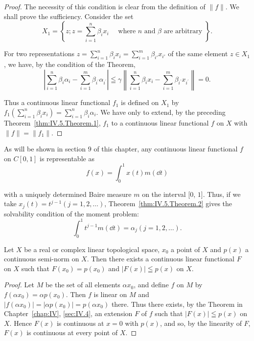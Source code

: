 \begin{proof}
 The necessity of this condition is clear from the definition of $\|f\|$. We shall prove the sufficiency. Consider the set 
\[
X _{1} = \left\{z; z = \sum\limits_{i=1} ^{n} \beta_{i} x _{i} \quad \text{ where } n \text{ and } \beta \text{ are arbitrary } \right\}. \]

For two representations $z = \sum\limits_{i=1}^{n} \beta_i x_i = \sum\limits_{i=1}^{m} \beta_{i'} x_{i'}$ of the same element $z \in X_1$, we have, by the condition of the Theorem, 
\[
\left| \sum\limits_{i=1} ^{n} \beta_{i} \alpha_{i} - \sum\limits_{i=1} ^{m} \beta_ {i ^{\prime}} \alpha_ {i ^{\prime}} \right| \leqq \gamma \left\| \sum\limits_{i=1} ^{n} \beta_{i} x _{i} - \sum\limits_{i=1} ^{m} \beta_ {i ^{\prime}} x _ {i ^{\prime}} \right\| = 0.
\]

Thus a continuous linear functional $f_{1}$ is defined on $X_{1}$ by $f_{1}\left(\sum\limits_{i=1}^{n}\beta_{i}x_{i}\right)=\sum\limits_{i=1}^{n}\beta_{i}\alpha_{i}$. We have only to extend, by the preceding Theorem~\ref{thm:IV.5.Theorem.1}, $f_{1}$ to a continuous linear functional $f$ on $X$ with $\|f\|=\|f_{1}\|$. 
\end{proof}

\begin{remarku} As will be shown in section $9$ of this chapter, any continuous linear functional $f$ on $C[0,1]$ is representable as 
\[
f (x) = \int_{0} ^{1} x (t) m (\dd t)
\]
\end{remarku}

with a uniquely determined Baire measure $m$ on the interval [$0$, $1$]. Thus, if we take $x_{j}(t) = t^{j-1} (j = 1, 2, \ldots)$, Theorem~\ref{thm:IV.5.Theorem.2} gives the solvability condition of the moment problem: 
\[
\int_{0} ^{1} t ^{j-1} m (\dd t) = \alpha_{j} (j = 1, 2, \dots).
\]


\label{sec:IV.6}

\begin{theorem}\label{thm:IV.6.Theorem.1} Let $X$ be a real or complex linear topological space, $x_{0}$ a point of $X$ and $p(x)$ a continuous semi-norm on $X$. Then there exists a continuous linear functional $F$ on $X$ such that $F(x_{0}) = p(x_{0})$ and $|F(x)| \leqq p(x)$ on $X$. 
\end{theorem}

\begin{proof}
 Let $M$ be the set of all elements $\alpha x_{0}$, and define $f$ on $M$ by $f(\alpha x_{0}) = \alpha p(x_{0})$. Then $f$ is linear on $M$ and $|f(\alpha x_{0})| = |\alpha p(x_{0})| = p(\alpha x_{0})$ there. Thus there exists, by the Theorem in Chapter~\ref{chap:IV}, \ref{sec:IV.4}, an extension $F$ of $f$ such that $|F(x)| \leqq p(x)$ on $X$. Hence $F(x)$ is continuous at $x = 0$ with $p(x)$, and so, by the linearity of $F$, $F(x)$ is continuous at every point of $X$. 
\end{proof}

